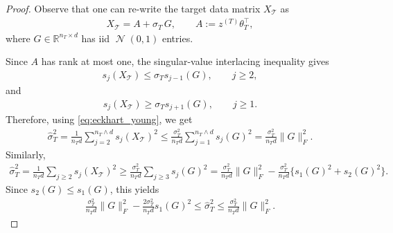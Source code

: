\documentclass[10pt]{article}
\newcommand{\R}{\mathbb R}
\newcommand{\wh}{\widehat}
\DeclareMathOperator{\dnorm}{\mathcal N}
\newcommand{\calT}{\mathcal T}
\newcommand{\trg}{T}
\newcommand{\thetaT}{\theta_{\trg}}
\newcommand{\nT}{n_{\trg}}
\newcommand{\sigmaT}{\sigma_{\trg}}
\newcommand{\ztar}{z^{(\trg)}}
\begin{document}
\begin{proof}
Observe that one can re-write the target data matrix $X_\calT$ as 
\begin{align}
X_\calT=A+\sigmaT\,G,\qquad A:=\ztar\thetaT^\top,
\end{align}
where $G\in\R^{\nT\times d}$ has iid $\dnorm(0,1)$ entries. 

Since $A$ has rank at
most one, the singular-value interlacing inequality \citep{Franklin1993} gives
\begin{align}
    s_j(X_\calT)\le \sigmaT s_{j-1}(G),
    \qquad j\ge 2,
    \label{eq:sigmaT_rank_one_interlace_upper}
\end{align}
and
\begin{align}
    s_j(X_\calT)\ge \sigmaT s_{j+1}(G),
    \qquad j\ge 1.
    \label{eq:sigmaT_rank_one_interlace_lower}
\end{align}
Therefore, using \eqref{eq:eckhart_young}, we get
\begin{align}
    \wh\sigma^2_T
    =
    \frac{1}{\nT d}\sum_{j=2}^{\nT \wedge d}s_j(X_\calT)^2
    \le
    \frac{\sigmaT^2}{\nT d}\sum_{j=1}^{\nT \wedge d}s_j(G)^2
    =
    \frac{\sigmaT^2}{\nT d}\|G\|_F^2.
    \label{eq:sigmaT_hat_upper}
\end{align}
Similarly,
\begin{align}
    \wh\sigma^2_T
    =
    \frac{1}{\nT d}\sum_{j\ge 2}s_j(X_\calT)^2
    \ge
    \frac{\sigmaT^2}{\nT d}\sum_{j\ge 3}s_j(G)^2
    =
    \frac{\sigmaT^2}{\nT d}\|G\|_F^2
    -
    \frac{\sigmaT^2}{\nT d}\{s_1(G)^2+s_2(G)^2\}.
\end{align}
Since $s_2(G)\le s_1(G)$, this yields
\begin{align}
    \frac{\sigmaT^2}{\nT d}\|G\|_F^2
    -
    \frac{2\sigmaT^2}{\nT d}s_1(G)^2
    \le
    \wh\sigma^2_T
    \le
    \frac{\sigmaT^2}{\nT d}\|G\|_F^2.
    \label{eq:sigmaT_hat_sandwich}
\end{align}


\end{proof}
\end{document}
